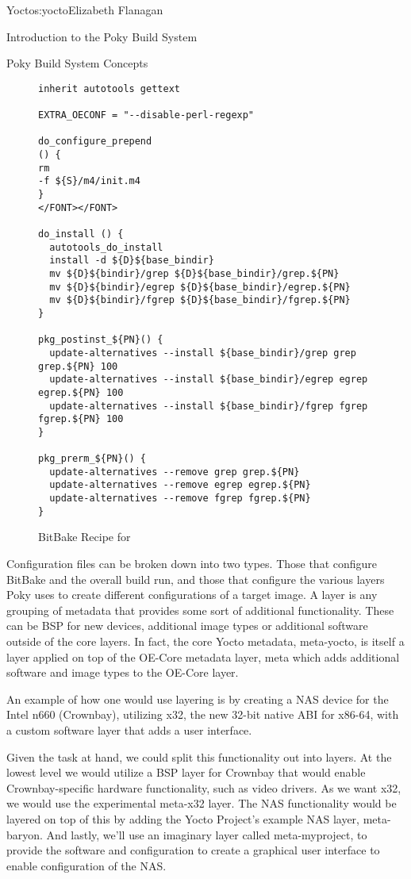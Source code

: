\begin{aosachapter}{Yocto}{s:yocto}{Elizabeth Flanagan}
\begin{aosasect1}{Introduction to the Poky Build System}
\begin{aosasect2}{Poky Build System Concepts}
\begin{figure}
\begin{verbatim}
inherit autotools gettext

EXTRA_OECONF = "--disable-perl-regexp"

do_configure_prepend
() {
rm
-f ${S}/m4/init.m4
}
</FONT></FONT>

do_install () {
  autotools_do_install
  install -d ${D}${base_bindir}
  mv ${D}${bindir}/grep ${D}${base_bindir}/grep.${PN}
  mv ${D}${bindir}/egrep ${D}${base_bindir}/egrep.${PN}
  mv ${D}${bindir}/fgrep ${D}${base_bindir}/fgrep.${PN}
}

pkg_postinst_${PN}() {
  update-alternatives --install ${base_bindir}/grep grep grep.${PN} 100
  update-alternatives --install ${base_bindir}/egrep egrep egrep.${PN} 100
  update-alternatives --install ${base_bindir}/fgrep fgrep fgrep.${PN} 100
}

pkg_prerm_${PN}() {
  update-alternatives --remove grep grep.${PN}
  update-alternatives --remove egrep egrep.${PN}
  update-alternatives --remove fgrep fgrep.${PN}
}
\end{verbatim}
\caption{BitBake Recipe for }
\label{fig.yocto.recipe}
\end{figure}

Configuration files can be broken down into two types. Those that
configure BitBake and the overall build run, and those that configure
the various layers Poky uses to create different configurations of a
target image. A layer is any grouping of metadata that provides some
sort of additional functionality. These can be BSP for new devices,
additional image types or additional software outside of the core
layers. In fact, the core Yocto metadata, meta-yocto, is itself a
layer applied on top of the OE-Core metadata layer, meta which adds
additional software and image types to the OE-Core layer.

An example of how one would use layering is by creating a NAS device
for the Intel n660 (Crownbay), utilizing x32, the new 32-bit native
ABI for x86-64, with a custom software layer that adds a user
interface.

Given the task at hand, we could split this functionality out into
layers. At the lowest level we would utilize a BSP layer for Crownbay
that would enable Crownbay-specific hardware functionality, such as
video drivers. As we want x32, we would use the experimental meta-x32
layer. The NAS functionality would be layered on top of this by adding
the Yocto Project's example NAS layer, meta-baryon. And lastly, we'll
use an imaginary layer called meta-myproject, to provide the software
and configuration to create a graphical user interface to enable
configuration of the NAS.


\end{aosasect2}
\end{aosasect1}
\end{aosachapter}
